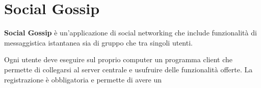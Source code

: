 \section{Social Gossip}
\textbf{Social Gossip} è un'applicazione di social networking che include funzionalità di messaggistica istantanea sia di gruppo che tra singoli utenti.

Ogni utente deve eseguire sul proprio computer un programma client che permette di collegarsi al server centrale e usufruire delle funzionalità offerte. La registrazione è obbligatoria e permette di avere un 